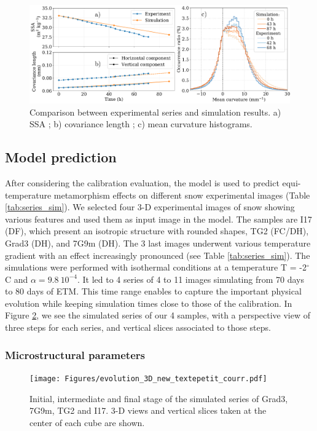 \documentclass[draft,ms]{agujournal2019}
\begin{document}
\begin{figure}
    \centering
    \includegraphics[width=\linewidth]{Figures/microstruct_EBONI_exp_simu.pdf}
    \caption{Comparison between \protect{} experimental series and simulation results. a) SSA ; b) covariance length ; c) mean curvature histograms.}
    \label{fig:eboni}
\end{figure}


\subsection{Model prediction}
\label{sec:prediction}

After considering the calibration evaluation, the model is used to predict equi-temperature metamorphism effects on different snow experimental images (Table \ref{tab:series_sim}). We selected four 3-D experimental images of snow showing various features and used them as input image in the model. The samples are I17 (DF), which present an isotropic structure with rounded shapes, TG2 (FC/DH), Grad3 (DH), and 7G9m (DH). The 3 last images underwent various temperature gradient with an effect increasingly pronounced (see Table \ref{tab:series_sim}). The simulations were performed with isothermal conditions at a temperature T = -2$^\circ$C and $\alpha = 9.8\ 10^{-4}$. It led to 4 series of 4 to 11 images simulating from 70 days to 80 days of ETM. This time range enables to capture the important physical evolution while keeping simulation times close to those of the calibration. In Figure \ref{fig:evolutions_3D}, we see the simulated series of our 4 samples, with a perspective view of three steps for each series, and vertical slices associated to those steps.\\



\subsubsection{Microstructural parameters}
\begin{figure}
    \centering
    \texttt{[image: Figures/evolution\_3D\_new\_textepetit\_courr.pdf]}
    \caption{Initial, intermediate and final stage of the simulated series of Grad3, 7G9m, TG2 and I17. 3-D views and vertical slices taken at the center of each cube are shown.}
    \label{fig:evolutions_3D}
\end{figure}
\end{document}
